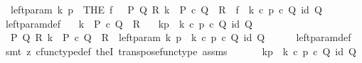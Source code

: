 \begin{isabellebody}
\ \ {\isachardoublequoteopen}left{\isacharunderscore}{\kern0pt}param\ k\ p\ {\isasymequiv}\ {\isacharparenleft}{\kern0pt}THE\ f{\isachardot}{\kern0pt}\ \ {\isasymexists}\ P\ Q\ R{\isachardot}{\kern0pt}\ k\ {\isacharcolon}{\kern0pt}\ P\ {\isasymtimes}\isactrlsub c\ Q\ {\isasymrightarrow}\ R\ {\isasymand}\ f\ {\isacharequal}{\kern0pt}\ k\ {\isasymcirc}\isactrlsub c\ {\isasymlangle}p\ {\isasymcirc}\isactrlsub c\ {\isasymbeta}\isactrlbsub Q\isactrlesub {\isacharcomma}{\kern0pt}\ id\ Q{\isasymrangle}{\isacharparenright}{\kern0pt}{\isachardoublequoteclose}\isanewline
\isanewline
{}\isamarkupfalse%
\ left{\isacharunderscore}{\kern0pt}param{\isacharunderscore}{\kern0pt}def{}{\isacharcolon}{\kern0pt}\isanewline
\ \ \ {\isachardoublequoteopen}k\ {\isacharcolon}{\kern0pt}\ P\ {\isasymtimes}\isactrlsub c\ Q\ {\isasymrightarrow}\ R{\isachardoublequoteclose}\isanewline
\ \ \ {\isachardoublequoteopen}k\isactrlbsub {\isacharbrackleft}{\kern0pt}p{\isacharcomma}{\kern0pt}{\isacharminus}{\kern0pt}{\isacharbrackright}{\kern0pt}\isactrlesub \ {\isasymequiv}\ k\ {\isasymcirc}\isactrlsub c\ {\isasymlangle}p\ {\isasymcirc}\isactrlsub c\ {\isasymbeta}\isactrlbsub Q\isactrlesub {\isacharcomma}{\kern0pt}\ id\ Q{\isasymrangle}{\isachardoublequoteclose}\isanewline
%
\isadelimproof
%
\endisadelimproof
%
\isatagproof
{}\isamarkupfalse%
\ {\isacharminus}{\kern0pt}\ \isanewline
\ \ \isamarkupfalse%
\ {\isachardoublequoteopen}{\isasymexists}\ P\ Q\ R{\isachardot}{\kern0pt}\ k\ {\isacharcolon}{\kern0pt}\ P\ {\isasymtimes}\isactrlsub c\ Q\ {\isasymrightarrow}\ R\ {\isasymand}\ left{\isacharunderscore}{\kern0pt}param\ k\ p\ {\isacharequal}{\kern0pt}\ k\ {\isasymcirc}\isactrlsub c\ {\isasymlangle}p\ {\isasymcirc}\isactrlsub c\ {\isasymbeta}\isactrlbsub Q\isactrlesub {\isacharcomma}{\kern0pt}\ id\ Q{\isasymrangle}{\isachardoublequoteclose}\isanewline
\ \ \ \ \isamarkupfalse%
\ left{\isacharunderscore}{\kern0pt}param{\isacharunderscore}{\kern0pt}def\ \isamarkupfalse%
\ {\isacharparenleft}{\kern0pt}smt\ {\isacharparenleft}{\kern0pt}z{}{\isacharparenright}{\kern0pt}\ cfunc{\isacharunderscore}{\kern0pt}type{\isacharunderscore}{\kern0pt}def\ the{}I{}\ transpose{\isacharunderscore}{\kern0pt}func{\isacharunderscore}{\kern0pt}type\ assms{\isacharparenright}{\kern0pt}\ \isanewline
\ \ \isamarkupfalse%
\ \isamarkupfalse%
\ {\isachardoublequoteopen}k\isactrlbsub {\isacharbrackleft}{\kern0pt}p{\isacharcomma}{\kern0pt}{\isacharminus}{\kern0pt}{\isacharbrackright}{\kern0pt}\isactrlesub \ {\isasymequiv}\ k\ {\isasymcirc}\isactrlsub c\ {\isasymlangle}p\ {\isasymcirc}\isactrlsub c\ {\isasymbeta}\isactrlbsub Q\isactrlesub {\isacharcomma}{\kern0pt}\ id\ Q{\isasymrangle}{\isachardoublequoteclose}\isanewline

\end{isabellebody}
